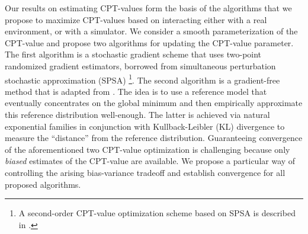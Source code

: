 Our results on estimating CPT-values form the basis of the algorithms that we propose to maximize CPT-values based on interacting either with a real environment, or with a simulator. 
We consider a smooth parameterization of the CPT-value and propose two algorithms for updating the CPT-value parameter. The first algorithm is a stochastic gradient scheme that uses two-point randomized gradient estimators, borrowed from simultaneous perturbation stochastic approximation (SPSA) \cite{spall}\footnote{A second-order CPT-value optimization scheme based on SPSA is described in \cite{la2016cumulative}.}. 
The second algorithm is a gradient-free method that is adapted from \cite{chang2013simulation}. The idea is to use a reference model that eventually concentrates on the global minimum and then empirically approximate this reference distribution well-enough. The latter is achieved via natural exponential families in conjunction with Kullback-Leibler (KL) divergence to measure the ``distance'' from the reference distribution. 
Guaranteeing convergence of the aforementioned two CPT-value optimization is challenging because only  \emph{biased} estimates of the CPT-value are available. We propose a particular way of controlling the arising bias-variance tradeoff and establish convergence for all proposed algorithms.


